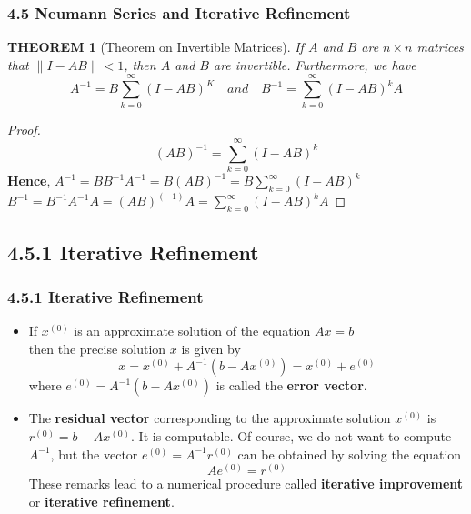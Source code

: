 \documentclass[notheorems,mathserif,table,compress]{beamer}  %
\begin{document}
\begin{frame}
  \frametitle{4.5 Neumann Series and Iterative Refinement}
  \newtheorem{theorem4}[theorem]{THEOREM}
  \begin{theorem4}[Theorem on Invertible Matrices]
  If $A$ and $B$ are $n\times n$ matrices that $\parallel I-AB\parallel<1$, then $A$ and $B$ are invertible. Furthermore, we have 
  \[ A^{-1}=B\sum_{k=0}^{\infty}(I-AB)^K \quad and \quad B^{-1}=\sum_{k=0}^{\infty}(I-AB)^kA \]
  \end{theorem4}
  \begin{proof}
  \[ (AB)^{-1}=\sum_{k=0}^{\infty}(I-AB)^k\]
  \textbf{Hence}, 
  $A^{-1}=BB^{-1}A^{-1}=B(AB)^{-1}=B\sum_{k=0}^{\infty}(I-AB)^k$\\
  \quad \qquad$B^{-1}=B^{-1}A^{-1}A=(AB)^(-1)A=\sum_{k=0}^{\infty}(I-AB)^kA$
  \end{proof}
\end{frame}


\subsection{4.5.1 Iterative Refinement}


\begin{frame}
  \frametitle{4.5.1 Iterative Refinement}
  \begin{itemize}
  \item If $x^{(0)}$ is an approximate solution of the equation $Ax=b$\\
  then the precise solution $x$ is given by 
  \[ x=x^{(0)}+A^{-1}(b-Ax^{(0)})=x^{(0)}+e^{(0)} \]
  where $e^{(0)}=A^{-1}(b-Ax^{(0)})$ is called the \textbf{error vector}. \\
  \item The \textbf{residual vector} corresponding to the approximate solution $x^{(0)}$ is $r^{(0)}=b-Ax^{(0)}$. It is computable. Of course, we do not want to compute $A^{-1}$, but the vector $e^{(0)}=A^{-1}r^{(0)}$ can be obtained by solving the equation 
  \[ Ae^{(0)}=r^{(0)} \]
  These remarks lead to a numerical procedure called \textbf{iterative improvement} or \textbf{iterative refinement}.
  \end{itemize}
\end{frame}
\end{document}
